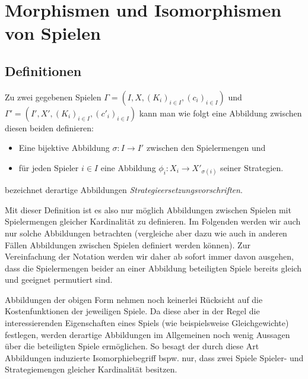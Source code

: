 \section[Morphismen]{Morphismen und Isomorphismen von Spielen}\label{sec:Morphismen}


\subsection{Definitionen}

Zu zwei gegebenen Spielen $\Gamma = (I, X, (K_i)_{i\in I}, (c_i)_{i\in I})$ und $\Gamma' = (I', X', (K_i)_{i\in I}, (c'_i)_{i\in I})$ kann man wie folgt eine Abbildung zwischen diesen beiden definieren:
\begin{itemize}
	\item Eine bijektive Abbildung $\sigma: I \to I'$ zwischen den Spielermengen und
	\item für jeden Spieler $i \in I$ eine Abbildung $\phi_i: X_i \to X'_{\sigma(i)}$ seiner Strategien.
\end{itemize}
\cite{Polyequilibrium} bezeichnet derartige Abbildungen \emph{Strategieersetzungsvorschriften}.

\begin{beob}
	Mit dieser Definition ist es also nur möglich Abbildungen zwischen Spielen mit Spielermengen gleicher Kardinalität zu definieren. Im Folgenden werden wir auch nur solche Abbildungen betrachten (vergleiche aber  dazu wie auch in anderen Fällen Abbildungen zwischen Spielen definiert werden können). Zur Vereinfachung der Notation werden wir daher ab sofort immer davon ausgehen, dass die Spielermengen beider an einer Abbildung beteiligten Spiele bereits gleich und geeignet permutiert sind.
\end{beob}

Abbildungen der obigen Form nehmen noch keinerlei Rücksicht auf die Kostenfunktionen der jeweiligen Spiele. Da diese aber in der Regel die interessierenden Eigenschaften eines Spiels (wie beispielsweise Gleichgewichte) festlegen, werden derartige Abbildungen im Allgemeinen noch wenig Aussagen über die beteiligten Spiele ermöglichen. So besagt der durch diese Art Abbildungen induzierte Isomorphiebegriff bspw. nur, dass zwei Spiele Spieler- und Strategiemengen gleicher Kardinalität besitzen.

